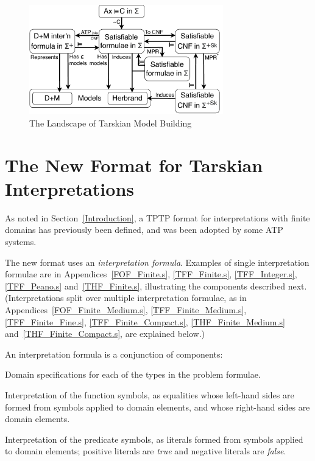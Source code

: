 \documentclass{easychair}
\newenvironment{packed_itemize}{
\vspace*{-0.2em}
\begin{itemize}
\setlength{\partopsep}{0pt}
\setlength{\itemsep}{1pt}
\setlength{\parskip}{0pt}
\setlength{\parsep}{0pt}
}{\end{itemize}}
\begin{document}
\begin{figure}[htbp]
\centering
\includegraphics[width=0.75\textwidth]{ModelLandscape.pdf}
\caption{The Landscape of Tarskian Model Building}
\label{ModelLandscape}
\end{figure}

\section{The New Format for Tarskian Interpretations}
\label{NewTarskian}

As noted in Section~\ref{Introduction}, a TPTP format for interpretations with finite domains 
has previously been defined, and was been adopted by some ATP systems.

The new format uses an {\em interpretation formula}. 
Examples of single interpretation formulae are in 
Appendices~\ref{FOF_Finite.s}, \ref{TFF_Finite.s}, \ref{TFF_Integer.s}, \ref{TFF_Peano.s} 
and~\ref{THF_Finite.s},
illustrating the components described next. 
(Interpretations split over multiple interpretation formulae, as in 
Appendices~\ref{FOF_Finite_Medium.s}, \ref{TFF_Finite_Medium.s}, \ref{TFF_Finite_Fine.s},
\ref{TFF_Finite_Compact.s}, \ref{THF_Finite_Medium.s} and~\ref{THF_Finite_Compact.s}, are 
explained below.)

An interpretation formula is a conjunction of components:
\begin{packed_itemize}
\item Domain specifications for each of the types in the problem formulae.
\item Interpretation of the function symbols, as equalities whose left-hand sides are formed from 
      symbols applied to domain elements, and whose right-hand sides are domain elements.
\item Interpretation of the predicate symbols, as literals formed from symbols applied
      to domain elements; positive literals are {\em true} and negative literals are {\em false}.
\end{packed_itemize}
\end{document}
